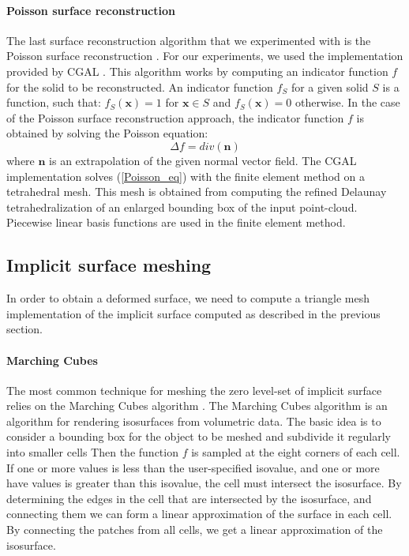 \documentclass[ams]{U-AizuGT}
\def\x{\mathbf{x}}
\def\n{\mathbf{n}}
\begin{document}
\paragraph{Poisson surface reconstruction}
\label{Poisson_recon}
The last surface reconstruction algorithm that we experimented with is 
the Poisson surface reconstruction \cite{KBH06}.
For our experiments, we used the implementation provided 
by CGAL \cite{cgal}.
This algorithm works by computing an indicator function $f$ for the solid 
to be reconstructed. An indicator function $f_S$ for a given solid $S$ is 
a function, such that: $f_S(\x) = 1$ for $\x \in S$ and $f_S(\x) = 0$ otherwise. 
In the case of the Poisson surface reconstruction approach, the indicator function
$f$ is obtained by solving the Poisson equation:
\begin{equation}\label{Poisson_eq}
\Delta f=div(\n)
\end{equation}
where $\n$ is an extrapolation of the given normal vector field.
The CGAL implementation solves (\ref{Poisson_eq}) with 
the finite element method on a tetrahedral mesh. 
This mesh is obtained from computing the refined Delaunay tetrahedralization 
of an enlarged bounding box of the input point-cloud.
Piecewise linear basis functions are used in the finite element method. 


\subsection{Implicit surface meshing}
In order to obtain a deformed surface, we need to compute a triangle mesh implementation of 
the implicit surface computed as described in the previous section. 

\paragraph{Marching Cubes}
The most common technique for meshing the zero level-set of implicit surface relies 
on the Marching Cubes algorithm \cite{LC87}.
The Marching Cubes algorithm is an algorithm for rendering isosurfaces from volumetric data. 
The basic idea is to consider a bounding box for the object to be meshed and subdivide it 
regularly into smaller cells
Then the function $f$ is sampled at the eight corners of each cell. 
If one or more values is less than the user-specified isovalue, and one or more have values 
is greater than this isovalue, the cell must intersect the isosurface.
By determining the edges in the cell that are intersected by the isosurface, 
and connecting them we can form a linear approximation of the surface in each cell.
By connecting the patches from all cells, we get a linear approximation of the isosurface.
\end{document}
